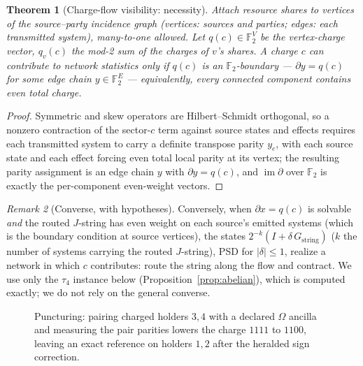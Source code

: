 \documentclass[11pt]{article}
\theoremstyle{plain}
\newtheorem{theorem}{Theorem}[section]
\theoremstyle{definition}
\theoremstyle{remark}
\newtheorem{remark}[theorem]{Remark}
\theoremstyle{plain}
\newcommand{\F}{\mathbb{F}}
\newcommand{\Om}{\Omega}
\begin{document}
\begin{theorem}[Charge-flow visibility: necessity]\label{thm:flow}
Attach resource shares to vertices of the \emph{source--party
incidence graph} (vertices: sources and parties; edges: each
transmitted system), many-to-one allowed. Let $q(c)\in\F_2^{V}$ be
the vertex-charge vector, $q_v(c)$ the mod-2 sum of the charges of
$v$'s shares. A charge $c$ can contribute to network statistics
only if $q(c)$ is an $\F_2$-boundary --- $\partial y = q(c)$ for
some edge chain $y\in\F_2^{E}$ --- equivalently, every connected
component contains even total charge.
\end{theorem}

\begin{proof}
Symmetric and skew operators are Hilbert--Schmidt orthogonal, so a
nonzero contraction of the sector-$c$ term against source states
and effects requires each transmitted system to carry a definite
transpose parity $y_e$, with each source state and each effect
forcing even total local parity at its vertex; the resulting
parity assignment is an edge chain $y$ with $\partial y = q(c)$,
and $\operatorname{im}\partial$ over $\F_2$ is exactly the
per-component even-weight vectors.
\end{proof}

\begin{remark}[Converse, with hypotheses]\label{rem:flowconv}
Conversely, when $\partial x = q(c)$ is solvable \emph{and} the
routed $J$-string has even weight on each source's emitted systems
(which is the boundary condition at source vertices), the states
$2^{-k}(I + \delta\,G_{\mathrm{string}})$ ($k$ the number of
systems carrying the routed $J$-string), PSD for
$|\delta|\le1$, realize a network in which $c$ contributes: route
the string along the flow and contract. We use only the $\tau_4$
instance below (Proposition~\ref{prop:abelian}), which is
computed exactly; we do not rely on the general converse.
\end{remark}

\begin{figure}[t]
\centering
{}
\caption{Puncturing: pairing charged holders $3,4$ with a declared
$\Om$ ancilla and measuring the pair parities lowers the charge
$1111$ to $1100$, leaving an exact reference on holders $1,2$
after the heralded sign correction.}
\label{fig:puncture}
\end{figure}
\end{document}
